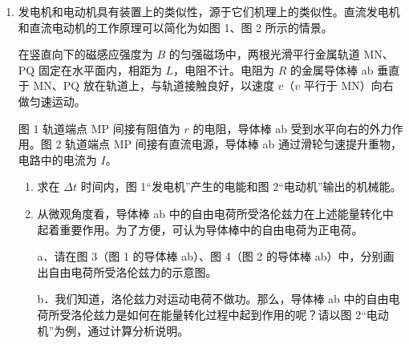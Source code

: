 \documentclass[\gkver]{gaokaozhenti}
\begin{document}
\begin{enumerate}
{\begin{enumerate}
	\item
	$\frac{2\pi m}{qB}$，$\frac{q^{2}B}{2\pi m}$

	\item
	$\frac{(M + m)(qBR)^{2}}{2mMc^{2}}$

\end{enumerate}
}

\item
发电机和电动机具有装置上的类似性，源于它们机理上的类似性。直流发电机和直流电动机的工作原理可以简化为如图 1、图 2 所示的情景。

在竖直向下的磁感应强度为 $B$ 的匀强磁场中，两根光滑平行金属轨道 MN、PQ 固定在水平面内，相距为 $L$，电阻不计。电阻为 $R$ 的金属导体棒 ab 垂直于 MN、PQ 放在轨道上，与轨道接触良好，以速度 $v$（$v$ 平行于 MN）向右做匀速运动。

图 1 轨道端点 MP 间接有阻值为 $r$ 的电阻，导体棒 ab 受到水平向右的外力作用。图 2 轨道端点 MP 间接有直流电源，导体棒 ab 通过滑轮匀速提升重物，电路中的电流为 $I$。

\begin{enumerate}
	\item
	求在 $\Delta t$ 时间内，图 1“发电机”产生的电能和图 2“电动机”输出的机械能。
	\item
	从微观角度看，导体棒 ab 中的自由电荷所受洛伦兹力在上述能量转化中起着重要作用。为了方便，可认为导体棒中的自由电荷为正电荷。

	a．请在图 3（图 1 的导体棒 ab）、图 4（图 2 的导体棒 ab）中，分别画出自由电荷所受洛伦兹力的示意图。

	b．我们知道，洛伦兹力对运动电荷不做功。那么，导体棒 ab 中的自由电荷所受洛伦兹力是如何在能量转化过程中起到作用的呢？请以图 2“电动机”为例，通过计算分析说明。
\end{enumerate}


\end{enumerate}
\end{document}
